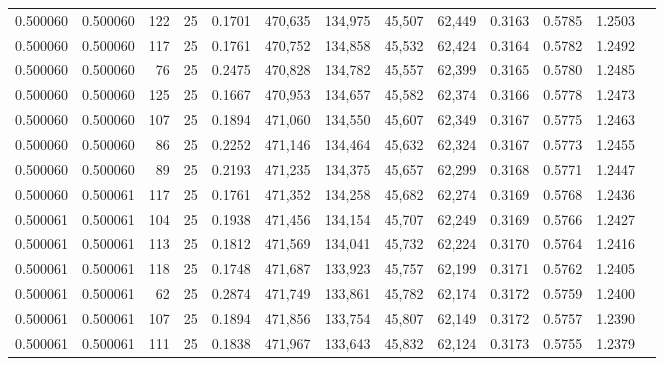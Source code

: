 \begin{tabular}{rrrrrrrrrrrrr}
0.500060 & 0.500060 &   122 &  25 &                                     0.1701 & 470,635 & 134,975 &  45,507 &  62,449 & 0.3163 & 0.5785 & 1.2503 \\
0.500060 & 0.500060 &   117 &  25 &                                     0.1761 & 470,752 & 134,858 &  45,532 &  62,424 & 0.3164 & 0.5782 & 1.2492 \\
0.500060 & 0.500060 &    76 &  25 &                                     0.2475 & 470,828 & 134,782 &  45,557 &  62,399 & 0.3165 & 0.5780 & 1.2485 \\
0.500060 & 0.500060 &   125 &  25 &                                     0.1667 & 470,953 & 134,657 &  45,582 &  62,374 & 0.3166 & 0.5778 & 1.2473 \\
0.500060 & 0.500060 &   107 &  25 &                                     0.1894 & 471,060 & 134,550 &  45,607 &  62,349 & 0.3167 & 0.5775 & 1.2463 \\
0.500060 & 0.500060 &    86 &  25 &                                     0.2252 & 471,146 & 134,464 &  45,632 &  62,324 & 0.3167 & 0.5773 & 1.2455 \\
0.500060 & 0.500060 &    89 &  25 &                                     0.2193 & 471,235 & 134,375 &  45,657 &  62,299 & 0.3168 & 0.5771 & 1.2447 \\
0.500060 & 0.500061 &   117 &  25 &                                     0.1761 & 471,352 & 134,258 &  45,682 &  62,274 & 0.3169 & 0.5768 & 1.2436 \\
0.500061 & 0.500061 &   104 &  25 &                                     0.1938 & 471,456 & 134,154 &  45,707 &  62,249 & 0.3169 & 0.5766 & 1.2427 \\
0.500061 & 0.500061 &   113 &  25 &                                     0.1812 & 471,569 & 134,041 &  45,732 &  62,224 & 0.3170 & 0.5764 & 1.2416 \\
0.500061 & 0.500061 &   118 &  25 &                                     0.1748 & 471,687 & 133,923 &  45,757 &  62,199 & 0.3171 & 0.5762 & 1.2405 \\
0.500061 & 0.500061 &    62 &  25 &                                     0.2874 & 471,749 & 133,861 &  45,782 &  62,174 & 0.3172 & 0.5759 & 1.2400 \\
0.500061 & 0.500061 &   107 &  25 &                                     0.1894 & 471,856 & 133,754 &  45,807 &  62,149 & 0.3172 & 0.5757 & 1.2390 \\
0.500061 & 0.500061 &   111 &  25 &                                     0.1838 & 471,967 & 133,643 &  45,832 &  62,124 & 0.3173 & 0.5755 & 1.2379 \\

\end{tabular}
